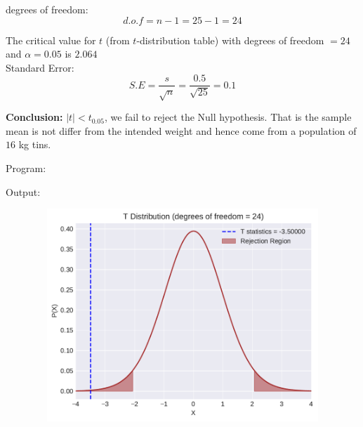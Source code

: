 \documentclass[a4paper,11pt,openright]{report}
\begin{document}
\begin{enumerate}
\begin{enumerate}
degrees of freedom:
\begin{equation*}
d.o.f = n - 1 = 25 - 1 = 24
\end{equation*}

The critical value for $t$ (from $t$-distribution table) with degrees of freedom $= 24$ and
$\alpha = 0.05$ is $2.064$ \\

Standard Error:
\begin{equation*}
S.E = \frac{s}{\sqrt{n}} = \frac{0.5}{\sqrt{25}} = 0.1
\end{equation*} 

\textbf{Conclusion:} $|t| < t_{0.05}$, we fail to reject the Null hypothesis. That is the
sample mean is not differ from the intended weight and hence come from a population of $16$ 
kg tins.

\end{enumerate}

\vspace{0.5cm}

Program:


\vspace{0.5cm}

Output:


\begin{figure}[ht!]
\includegraphics[width=16cm,height=8cm,keepaspectratio]{tscript1a.pdf}
\centering
\end{figure}

\vspace{0.5cm} 



\end{enumerate}
\end{document}
